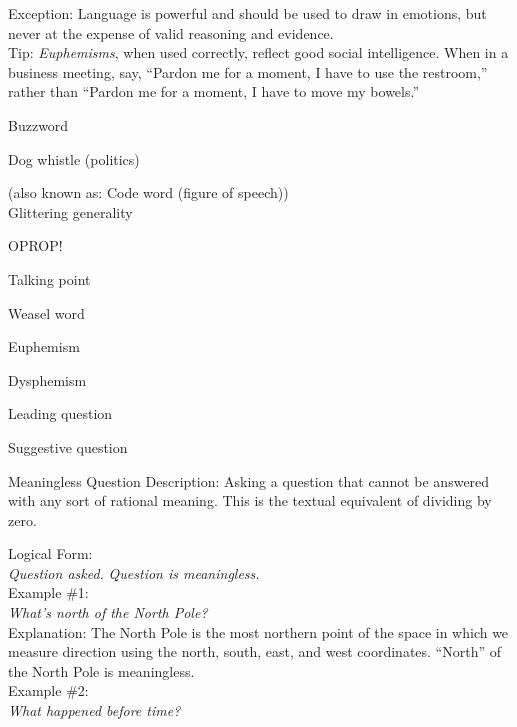 \documentclass[a4paper,12pt,single,pdftex]{scrartcl}
\begin{document}
{    
      Exception: Language is powerful and should be used to draw in emotions, but never at the expense of valid reasoning and evidence.
    \\

    
      Tip: {\em Euphemisms}, when used correctly, reflect good social intelligence. When in a business meeting, say, “Pardon me for a moment, I have to use the restroom,” rather than “Pardon me for a moment, I have to move my bowels.”
    \\

  }


Buzzword

Dog whistle (politics)
    
      (also known as: Code word (figure of speech))
    \\

  

Glittering generality

OPROP!

Talking point

Weasel word

Euphemism

Dysphemism

Leading question

Suggestive question

Meaningless Question
    Description: Asking a question that cannot be answered with any sort of rational meaning. This is the textual equivalent of dividing by zero.

    
      Logical Form:
    \\

    
      {\em Question asked.} \newline
{\em Question is meaningless.}
    \\

    
      Example \#1:
    \\

    
      {\em What’s north of the North Pole?}
    \\

    
      Explanation: The North Pole is the most northern point of the space in which we measure direction using the north, south, east, and west coordinates. “North” of the North Pole is meaningless.
    \\

    
      Example \#2:
    \\

    
      {\em What happened before time?}
    \\
\end{document}
